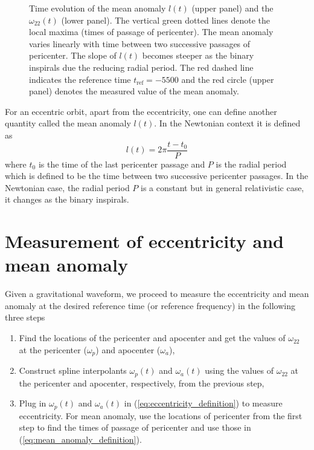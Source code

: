 \documentclass[aps,prd,amsmath,floats,floatfix, twocolumn,
superscriptaddress,nofootinbib,showpacs]{revtex4-1}
\begin{document}
\begin{figure}
\begin{minipage}[t]{0.475\textwidth}
      \label{fig:mean_anomaly_definition}
      \caption{Time evolution of the mean anomaly $l(t)$ (upper panel) and the $\omega_{22}(t)$ (lower panel). The vertical green dotted lines denote the local maxima (times of passage of pericenter). The mean anomaly varies linearly with time between two successive passages of pericenter. The slope of $l(t)$ becomes steeper as the binary inspirals due the reducing radial period. The red dashed line indicates the reference time $t_{\text{ref}}=-5500$ and the red circle (upper panel) denotes the measured value of the mean anomaly.}
    \end{minipage}
\end{figure}

For an eccentric orbit, apart from the eccentricity, one can define another quantity called the mean anomaly $l(t)$. In the Newtonian context it is defined as
\begin{equation}
\label{eq:mean_anomaly_definition}
l(t) = 2\pi \frac{t - t_0}{P}
\end{equation}
where $t_0$ is the time of the last pericenter passage and $P$ is the radial period which is defined to be the time between two successive pericenter passages.
In the Newtonian case, the radial period $P$ is a constant but in general relativistic case, it changes as the binary inspirals.

\section{Measurement of eccentricity and mean anomaly}
\label{sec:measurement-of-eccentricity-and-mean-anomaly}
Given a gravitational waveform, we proceed to measure the eccentricity and mean anomaly at the desired reference time (or reference frequency) in the following three steps
\begin{enumerate}
\item Find the locations of the pericenter and apocenter and get the values of $\omega_{22}$ at the pericenter ($\omega_p$) and apocenter ($\omega_a$),
\item Construct spline interpolants $\omega_p(t)$ and $\omega_a(t)$ using the values of $\omega_{22}$ at the pericenter and apocenter, respectively, from the previous step,
\item Plug in $\omega_p(t)$ and $\omega_a(t)$ in (\ref{eq:eccentricity_definition}) to measure eccentricity. For mean anomaly, use the locations of pericenter from the first step to find the times of
  passage of pericenter and use those in (\ref{eq:mean_anomaly_definition}).
\end{enumerate}
\end{document}

